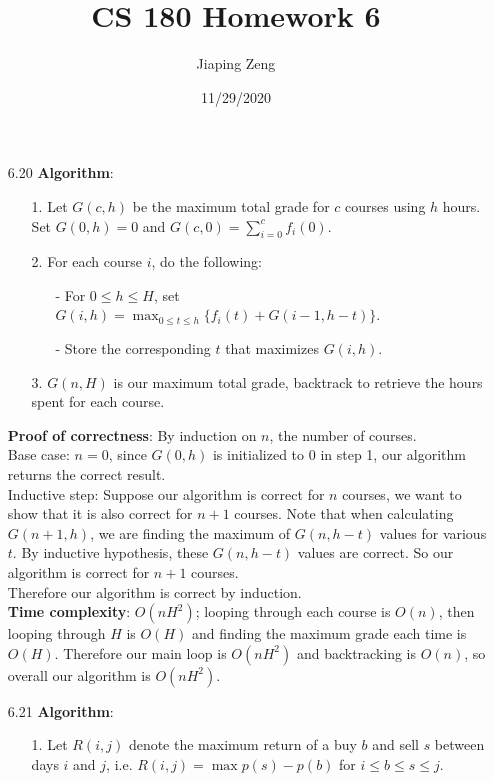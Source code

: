 \documentclass{article}
\title{CS 180 Homework 6}
\date{11/29/2020}
\author{Jiaping Zeng}
\begin{document}
\maketitle

\begin{itemize}
    \item [6.20]
          \textbf{Algorithm}:
          \begin{itemize}
              \item [1.] Let $G(c,h)$ be the maximum total grade for $c$ courses using $h$ hours. Set $G(0,h)=0$ and $G(c,0)=\sum_{i=0}^c f_i(0)$.
              \item [2.] For each course $i$, do the following:
                    \begin{itemize}
                        \item [-] For $0\leq h\leq H$, set $G(i,h)=\max_{0\leq t\leq h}\{f_i(t)+G(i-1,h-t)\}$.
                        \item [-] Store the corresponding $t$ that maximizes $G(i,h)$.
                    \end{itemize}
              \item [3.] $G(n,H)$ is our maximum total grade, backtrack to retrieve the hours spent for each course.
          \end{itemize}
          \textbf{Proof of correctness}: By induction on $n$, the number of courses.\\
          Base case: $n=0$, since $G(0,h)$ is initialized to 0 in step 1, our algorithm returns the correct result.\\
          Inductive step: Suppose our algorithm is correct for $n$ courses, we want to show that it is also correct for $n+1$ courses. Note that when calculating $G(n+1,h)$, we are finding the maximum of $G(n,h-t)$ values for various $t$. By inductive hypothesis, these $G(n,h-t)$ values are correct. So our algorithm is correct for $n+1$ courses.\\
          Therefore our algorithm is correct by induction.\\
          \textbf{Time complexity}: $O(nH^2)$; looping through each course is $O(n)$, then looping through $H$ is $O(H)$ and finding the maximum grade each time is $O(H)$. Therefore our main loop is $O(nH^2)$ and backtracking is $O(n)$, so overall our algorithm is $O(nH^2)$.
    \item [6.21]
          \textbf{Algorithm}:
          \begin{itemize}
              \item [1.] Let $R(i,j)$ denote the maximum return of a buy $b$ and sell $s$ between days $i$ and $j$, i.e. $R(i,j)=\max p(s)-p(b)$ for $i\leq b\leq s\leq j$.

\end{itemize}
\end{itemize}
\end{document}
